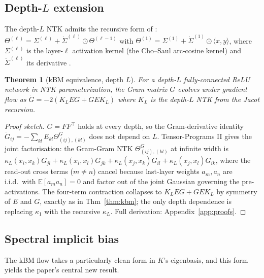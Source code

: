 \documentclass{article}
\newtheorem{theorem}{Theorem}
\newcommand{\E}{E}
\begin{document}
\subsection{Depth-$L$ extension}

The depth-$L$ NTK admits the recursive form of \citet{jacot2018neural}:
$\Theta^{(\ell)} = \Sigma^{(\ell)} + \dot{\Sigma}^{(\ell)} \odot \Theta^{(\ell-1)}$
with $\Theta^{(1)} = \Sigma^{(1)} + \dot{\Sigma}^{(1)} \odot \langle x,y\rangle$,
where $\Sigma^{(\ell)}$ is the layer-$\ell$ activation kernel (the
Cho--Saul arc-cosine kernel) and $\dot\Sigma^{(\ell)}$ its derivative
\citep{cho2009kernel}.

\begin{theorem}[kBM equivalence, depth $L$]
\label{thm:depth}
For a depth-$L$ fully-connected ReLU network in NTK parameterization, the
Gram matrix $G$ evolves under gradient flow as $\dot G = -2(K_L \E G + G \E K_L)$
where $K_L$ is the depth-$L$ NTK from the Jacot recursion.
\end{theorem}

\begin{proof}[Proof sketch]
$G = FF^\top$ holds at every depth, so the Gram-derivative identity
$\dot G_{ij} = -\sum_{kl}\E_{kl}\Theta^G_{(ij),(kl)}$ does not depend on
$L$. Tensor-Programs II
\citep{yang2020tensor} gives the joint factorisation: the Gram-Gram
NTK $\Theta^G_{(ij),(kl)}$ at infinite width is
$\kappa_L(x_i,x_k) G_{jl} + \kappa_L(x_i,x_l) G_{jk} + \kappa_L(x_j,x_k) G_{il} + \kappa_L(x_j,x_l) G_{ik}$,
where the read-out cross terms ($m\!\neq\!n$) cancel because last-layer
weights $a_m, a_n$ are i.i.d.\ with $\mathbb{E}[a_m a_n]\!=\!0$ and
factor out of the joint Gaussian governing the pre-activations. The
four-term contraction collapses to $K_L \E G + G \E K_L$ by symmetry
of $\E$ and $G$, exactly as in Thm~\ref{thm:kbm}; the only depth
dependence is replacing $\kappa_1$ with the recursive $\kappa_L$.
Full derivation: Appendix~\ref{app:proofs}.
\end{proof}

\subsection{Spectral implicit bias}

The kBM flow takes a particularly clean form in $K$'s eigenbasis, and this
form yields the paper's central new result.
\end{document}
